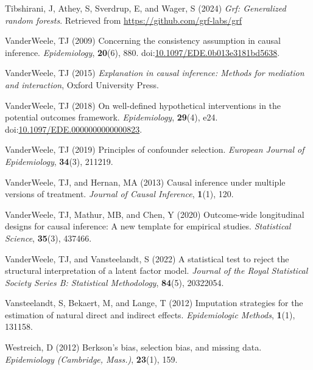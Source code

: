 \documentclass[
  singlecolumn]{article}
\newlength{\cslhangindent}
\newenvironment{CSLReferences}[2] %
 {\begin{list}{}{%
  \setlength{\itemindent}{0pt}
  \setlength{\leftmargin}{0pt}
  \setlength{\parsep}{0pt}
  \ifodd #1
   \setlength{\leftmargin}{\cslhangindent}
   \setlength{\itemindent}{-1\cslhangindent}
  \fi
  \setlength{\itemsep}{#2\baselineskip}}}
 {\end{list}}
\begin{document}
\begin{CSLReferences}{1}{0}
Tibshirani, J, Athey, S, Sverdrup, E, and Wager, S (2024) \emph{Grf:
Generalized random forests}. Retrieved from
\url{https://github.com/grf-labs/grf}

VanderWeele, TJ (2009) Concerning the consistency assumption in causal
inference. \emph{Epidemiology}, \textbf{20}(6), 880.
doi:\href{https://doi.org/10.1097/EDE.0b013e3181bd5638}{10.1097/EDE.0b013e3181bd5638}.

VanderWeele, TJ (2015) \emph{Explanation in causal inference: Methods
for mediation and interaction}, Oxford University Press.

VanderWeele, TJ (2018) On well-defined hypothetical interventions in the
potential outcomes framework. \emph{Epidemiology}, \textbf{29}(4), e24.
doi:\href{https://doi.org/10.1097/EDE.0000000000000823}{10.1097/EDE.0000000000000823}.

VanderWeele, TJ (2019) Principles of confounder selection.
\emph{European Journal of Epidemiology}, \textbf{34}(3), 211219.

VanderWeele, TJ, and Hernan, MA (2013) Causal inference under multiple
versions of treatment. \emph{Journal of Causal Inference},
\textbf{1}(1), 120.

VanderWeele, TJ, Mathur, MB, and Chen, Y (2020) Outcome-wide
longitudinal designs for causal inference: A new template for empirical
studies. \emph{Statistical Science}, \textbf{35}(3), 437466.

VanderWeele, TJ, and Vansteelandt, S (2022) A statistical test to reject
the structural interpretation of a latent factor model. \emph{Journal of
the Royal Statistical Society Series B: Statistical Methodology},
\textbf{84}(5), 20322054.

Vansteelandt, S, Bekaert, M, and Lange, T (2012) Imputation strategies
for the estimation of natural direct and indirect effects.
\emph{Epidemiologic Methods}, \textbf{1}(1), 131158.

Westreich, D (2012) Berkson's bias, selection bias, and missing data.
\emph{Epidemiology (Cambridge, Mass.)}, \textbf{23}(1), 159.


\end{CSLReferences}
\end{document}

